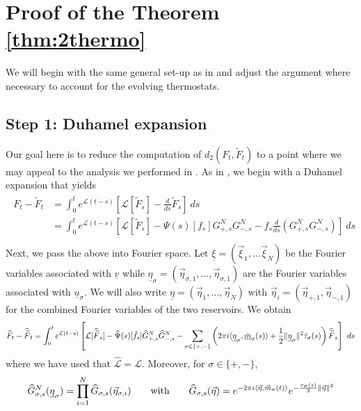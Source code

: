 \documentclass{article}
\newcommand\uv{{\underline v}}
\newcommand\uu{{\underline u}}
\newcommand\uxi{{\underline \xi}}
\newcommand\ueta{{\underline \eta}}
\newcommand\vxi{{\vec \xi}}
\newcommand\veta{{\vec \eta}}
\DeclarePairedDelimiter{\scal}{\langle}{\rangle}
\begin{document}
\section{Proof of the Theorem \ref{thm:2thermo}}\label{sec:proofs}

We will begin with the same general set-up as in \cite{BLP25} and adjust the argument where necessary to account for
the evolving thermostats. 


\subsection{Step 1: Duhamel expansion}\label{subsec:duhamel}

Our goal here is to reduce the computation of $d_2(F_t, \widetilde F_t)$ to a point where we may appeal to the analysis
we performed in \cite{BLP25}. As in \cite{BLP25}, we begin with a Duhamel expansion that yields %
\begin{align*}
\begin{split}
F_t - \widetilde F_t &= \int_0^t e^{\mathcal L(t - s)} \left[\mathcal L [\widetilde F_s] - \frac{d}{ds} \widetilde 
F_s\right] \ ds\\
&= \int_0^t e^{\mathcal L(t - s)} \left[\mathcal L [\widetilde F_s] - \Psi(s)[f_s] G_{+,s}^N G_{-,s}^N - f_s 
\frac{d}{ds}\left(G_{+,s}^NG_{-,s}^N\right) \right] \ ds\\
\end{split}
\end{align*}
%
Next, we pass the above into Fourier space. Let $\uxi=(\vxi_1,\ldots\vxi_N)$ be the Fourier variables associated with 
$\uv$ while $\ueta_\sigma=(\veta_{\sigma,1},\ldots,\veta_{\sigma,1})$ are the Fourier variables associated
with $\uu_\sigma$. We will also write $\ueta=(\veta_1,\ldots,\veta_N)$ with $\veta_i=(\veta_{+,1},\veta_{-,1})$ for the 
combined Fourier variables of the two reservoirs. We 
obtain
%
\begin{align*}
\widehat F_t - \widehat {\widetilde F}_t = \int_0^t e^{\mathcal L(t - s)} \left[\mathcal L [\widehat {\widetilde F}_s] -
\widehat\Psi(s) [\hat{f}_s] \widehat G_{+,s}^N\widehat G_{-,s}^N - \sum_{\sigma\in\{+,-\}}\left(2\pi
i\scal{\ueta_\sigma, \dot{\underline m}_\sigma(s)}+\frac 12\|\ueta_\sigma\|^2\dot\tau_\sigma(s)\right)\widehat
{\widetilde F}_s\right] \ ds
\end{align*}
%
where we have used that $\widehat {\mathcal L}=\mathcal L$. Moreover, for $\sigma\in\{+,-\}$,
%
\[
\widehat G_{\sigma,s}^N(\ueta_\sigma) =\prod_{i=1}^N\widehat G_{\sigma,s}(\veta_{\sigma,i}) \qquad\hbox{with}\qquad 
\widehat G_{\sigma,s}(\veta)=e^{-2\pi i\langle \veta, \vec m_\sigma(t)\rangle} e^{-\frac 
{\tau_\sigma(s)}{2} \|\veta\|^2}
\]
\end{document}
